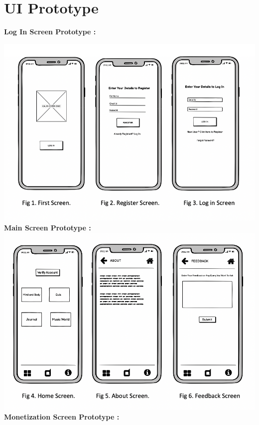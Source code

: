 \section{UI Prototype}
\textbf{Log In Screen Prototype :} 
\newline

\includegraphics[scale=0.9]{loginwireframe.png}
\newline
\textbf{Main Screen Prototype :} 
\newline
\includegraphics[scale=0.8]{mainscreenwireframe.png}
\newpage
\textbf{Monetization Screen Prototype :} 
\newline
